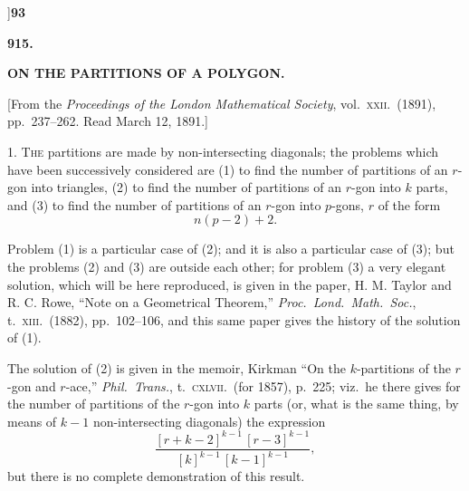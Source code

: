 \documentclass[11pt]{article}
\begin{document}

\newpage
{}]\hfill\hfill\textbf{93}

\vspace{2em}
\begin{center}\large\textbf{915.}\end{center}
\begin{center}\large\textbf{ON THE PARTITIONS OF A POLYGON.}\end{center}
\vspace{0.5em}
\begin{center}\small[From the \emph{Proceedings of the London Mathematical Society}, vol.\ \textsc{xxii}.\ (1891),\\
pp.\ 237--262. Read March 12, 1891.]\end{center}
\vspace{1em}

\hspace{1em} 1. T\textsc{he} partitions are made by non-intersecting diagonals;
the problems which have been successively considered are (1) to find the
number of partitions of an $r$-gon into triangles, (2) to find the number of
partitions of an $r$-gon into $k$ parts, and (3) to find the number of
partitions of an $r$-gon into $p$-gons, $r$ of the form
\[
n(p-2)+2.
\]

\hspace{1em} Problem (1) is a particular case of (2); and it is also a
particular case of (3); but the problems (2) and (3) are outside each other;
for problem (3) a very elegant solution, which will be here reproduced, is
given in the paper, H. M. Taylor and R. C. Rowe, ``Note on a Geometrical
Theorem,'' \emph{Proc.\ Lond.\ Math.\ Soc.}, t.\ \textsc{xiii}.\ (1882),
pp.\ 102--106, and this same paper gives the history of the solution of (1).

\hspace{1em} The solution of (2) is given in the memoir, Kirkman ``On the
$k$-partitions of the $r$-gon and $r$-ace,'' \emph{Phil.\ Trans.}, t.\
\textsc{cxlvii}.\ (for 1857), p.\ 225; viz.\ he there gives for the number of
partitions of the $r$-gon into $k$ parts (or, what is the same thing, by
means of $k-1$ non-intersecting diagonals) the expression
\[
\frac{[r+k-2]^{k-1}\,[r-3]^{k-1}}{[k]^{k-1}\,[k-1]^{k-1}},
\]
but there is no complete demonstration of this result.
\end{document}
